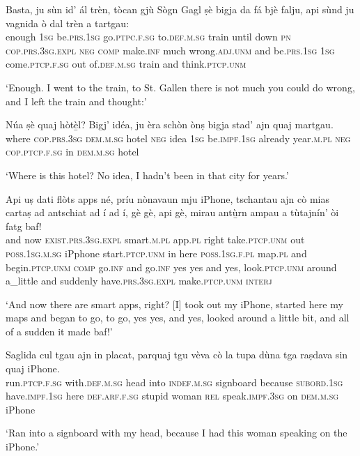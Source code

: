 \begin{linenumbers}
	\gll Basta, ju sùn id’ ál trèn, tòcan gjù Sògn Gagl ṣè bigja da fá bjè falju, api sùnd ju vagnida ò dal trèn a tartgau:   \\
	enough \textsc{1sg} be.\textsc{prs.1sg} go.\textsc{ptpc.f.sg} to.\textsc{def.m.sg} train until down \textsc{pn} {} \textsc{cop.prs.3sg.expl} \textsc{neg} \textsc{comp} make.\textsc{inf} much wrong.\textsc{adj.unm} and be.\textsc{prs.1sg} \textsc{1sg} come.\textsc{ptcp.f.sg} out of.\textsc{def.m.sg} train and think.\textsc{ptcp.unm}\\
\end{linenumbers}
\medskip
\glt `Enough. I went to the train, to St. Gallen there is not much you could do wrong, and I left the train and thought:'
\medskip

\begin{linenumbers}
	\gll Núa ṣè quaj hòtè̱l? Bigj' idéa, ju èra schòn ònṣ bigja stad’ ajn quaj martgau.   \\
	where \textsc{cop.prs.3sg} \textsc{dem.m.sg} hotel \textsc{neg} idea \textsc{1sg} be.\textsc{impf.1sg} already year.\textsc{m.pl} \textsc{neg} \textsc{cop.ptcp.f.sg} in \textsc{dem.m.sg} hotel\\
\end{linenumbers}
\medskip
\glt `Where is this hotel? No idea, I hadn't been in that city for years.'
\medskip

\begin{linenumbers}
	\gll  Api uṣ dati flòts apps né, príu nònavaun mju iPhone, tschantau ajn cò mias cartaṣ ad antschiat ad í ad í, gè gè, api gè, mirau antù̱rn ampau a tùtajnín’ òi fatg baf!   \\
	and now \textsc{exist.prs.3sg.expl} smart.\textsc{m.pl} app.\textsc{pl} right take.\textsc{ptcp.unm} out \textsc{poss.1sg.m.sg} iPphone start.\textsc{ptcp.unm} in here \textsc{poss.1sg.f.pl} map.\textsc{pl} and begin.\textsc{ptcp.unm} \textsc{comp} go.\textsc{inf} and go.\textsc{inf} yes yes and yes, look.\textsc{ptcp.unm} around a\_little and suddenly have.\textsc{prs.3sg.expl} make.\textsc{ptcp.unm} \textsc{interj}\\
\end{linenumbers}
\medskip
\glt `And now there are smart apps, right? [I] took out my iPhone, started here my maps and began to go, to go, yes yes, and yes, looked around a little bit, and all of a sudden it made baf!'
\medskip

\begin{linenumbers}
	\gll Saglida cul tgau ajn in placat, parquaj tgu vèva cò la tupa dùna tga raṣdava sin quaj iPhone.\\
	run.\textsc{ptcp.f.sg} with.\textsc{def.m.sg} head into \textsc{indef.m.sg} signboard because \textsc{subord.1sg} have.\textsc{impf.1sg} here \textsc{def.arf.f.sg} stupid woman \textsc{rel} speak.\textsc{impf.3sg} on \textsc{dem.m.sg} iPhone\\
\end{linenumbers}
\medskip
\glt `Ran into a signboard with my head, because I had this woman speaking on the iPhone.'
\medskip

